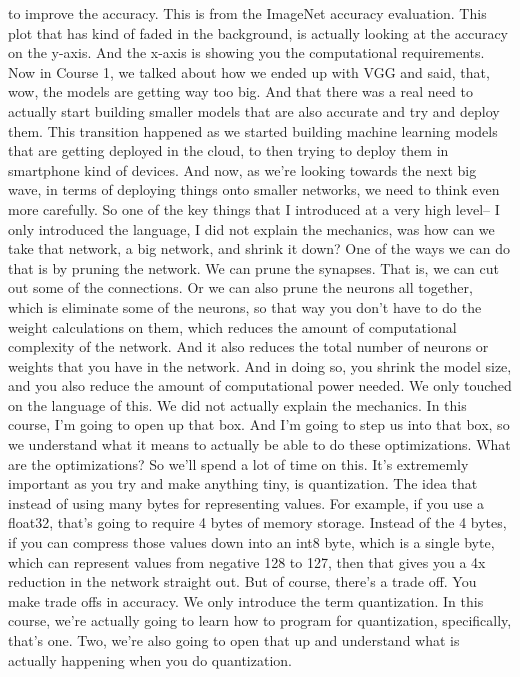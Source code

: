 to improve the accuracy.
This is from the ImageNet accuracy evaluation.
This plot that has kind of faded in the background,
is actually looking at the accuracy on the y-axis.
And the x-axis is showing you the computational requirements.
Now in Course 1, we talked about how we ended up with VGG and said,
that, wow, the models are getting way too big.
And that there was a real need to actually start
building smaller models that are also accurate and try and deploy them.
This transition happened as we started building machine
learning models that are getting deployed in the cloud,
to then trying to deploy them in smartphone kind of devices.
And now, as we're looking towards the next big wave,
in terms of deploying things onto smaller networks,
we need to think even more carefully.
So one of the key things that I introduced at a very high level--
I only introduced the language, I did not explain the mechanics,
was how can we take that network, a big network, and shrink it down?
One of the ways we can do that is by pruning the network.
We can prune the synapses.
That is, we can cut out some of the connections.
Or we can also prune the neurons all together,
which is eliminate some of the neurons, so that way
you don't have to do the weight calculations on them,
which reduces the amount of computational complexity
of the network.
And it also reduces the total number of neurons or weights
that you have in the network.
And in doing so, you shrink the model size,
and you also reduce the amount of computational power needed.
We only touched on the language of this.
We did not actually explain the mechanics.
In this course, I'm going to open up that box.
And I'm going to step us into that box, so we
understand what it means to actually be able to do these optimizations.
What are the optimizations?
So we'll spend a lot of time on this.
It's extrememly important as you try and make anything tiny, is quantization.
The idea that instead of using many bytes for representing values.
For example, if you use a float32, that's
going to require 4 bytes of memory storage.
Instead of the 4 bytes, if you can compress those values down
into an int8 byte, which is a single byte, which can represent values
from negative 128 to 127, then that gives you a 4x reduction
in the network straight out.
But of course, there's a trade off.
You make trade offs in accuracy.
We only introduce the term quantization.
In this course, we're actually going to learn
how to program for quantization, specifically, that's one.
Two, we're also going to open that up and understand what is actually
happening when you do quantization.
